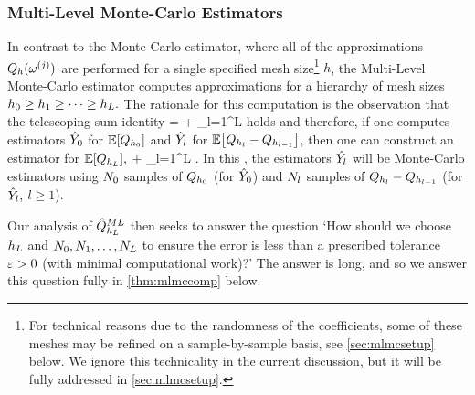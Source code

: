 \subsubsection{Multi-Level Monte-Carlo Estimators}

In contrast to the Monte-Carlo estimator, where all of the approximations $Q_{h}(\omega^{(j)})$ are performed for a single specified mesh size\footnote{For technical reasons due to the randomness of the coefficients, some of these meshes may be refined on a sample-by-sample basis, see \cref{sec:mlmcsetup} below. We ignore this technicality in the current discussion, but it will be fully addressed in \cref{sec:mlmcsetup}.} $h$, the Multi-Level Monte-Carlo estimator computes approximations for a hierarchy of mesh sizes $h_{0} \geq h_{1} \geq \cdots \geq h_{L}.$ The rationale for this computation is the observation that the telescoping sum identity
\beq\label{eq:mlmctelescope}
\EXP{\uhL} = \EXP{\uhz} + \sum_{l=1}^L \EXP{\uhl-\uhlmo}
\eeq
holds and therefore, if one computes estimators $\hat{Y}_{0}$ for $\EXP{\Qhz}$ and $\hat{Y}_{l}$ for $\EXP{\Qhl - \Qhlmo}$, then one can construct an estimator for $\EXP{\QhL},$ 
\beqs
\QhatMLhL \de \Yzhat + \sum_{l=1}^L \Ylhat.
\eeqs
In this , the estimators $\hat{Y_{l}}$ will be Monte-Carlo estimators using $N_{0}$ samples of $Q_{h_{0}}$ (for $\hat{Y}_{0}$) and $N_{l}$ samples of $Q_{h_{l}}-Q_{h_{l-1}}$ (for $\hat{Y}_{l},$ $l \geq 1$).

Our analysis of $\hat{Q}^{ML}_{h_{L}}$ then seeks to answer the question `How should we choose $h_{L}$ and $N_{0},N_{1},\ldots,N_{L}$ to ensure the error is less than a prescribed tolerance $\varepsilon>0$ (with minimal computational work)?' The answer is long, and so we answer this question fully in \cref{thm:mlmccomp} below.

